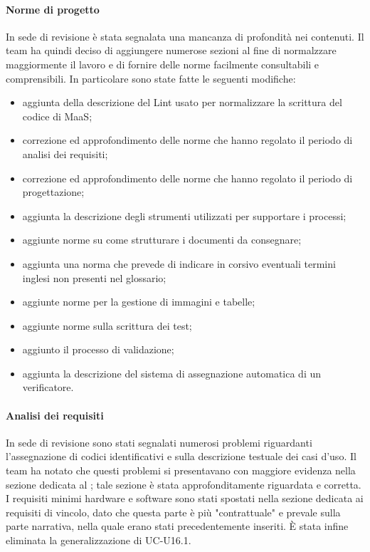 \paragraph*{Norme di progetto}
In sede di revisione è stata segnalata una mancanza di profondità nei contenuti. Il team ha quindi deciso di aggiungere numerose sezioni al fine di normalzzare maggiormente il lavoro e di fornire delle norme facilmente consultabili e comprensibili. In particolare sono state fatte le seguenti modifiche:
\begin{itemize}
\item aggiunta della descrizione del Lint usato per normalizzare la scrittura del codice di MaaS;
\item correzione ed approfondimento delle norme che hanno regolato il periodo di analisi dei requisiti;
\item correzione ed approfondimento delle norme che hanno regolato il periodo di progettazione;
\item aggiunta la descrizione degli strumenti utilizzati per supportare i processi;
\item aggiunte norme su come strutturare i documenti da consegnare;
\item aggiunta una norma che prevede di indicare in corsivo eventuali termini inglesi non presenti nel glossario;
\item aggiunte norme per la gestione di immagini e tabelle;
\item aggiunte norme sulla scrittura dei test;
\item aggiunto il processo di validazione;
\item aggiunta la descrizione del sistema di assegnazione automatica di un verificatore.
\end{itemize}

\paragraph*{Analisi dei requisiti}
In sede di revisione sono stati segnalati numerosi problemi riguardanti l'assegnazione di codici identificativi e sulla descrizione testuale dei casi d'uso. Il team ha notato che questi problemi si presentavano con maggiore evidenza nella sezione dedicata al ; tale sezione è stata approfonditamente riguardata e corretta. I requisiti minimi hardware e software sono stati spostati nella sezione dedicata ai requisiti di vincolo, dato che questa parte è più "contrattuale" e prevale sulla parte narrativa, nella quale erano stati precedentemente inseriti. È stata infine eliminata la generalizzazione di UC-U16.1.

